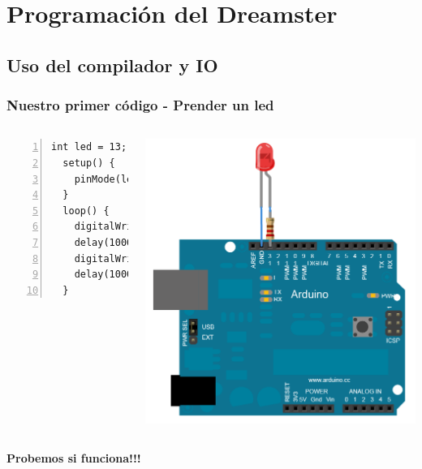 \documentclass[compress]{beamer}
\begin{document}
\section{Programación del Dreamster}
\subsection{Uso del compilador y IO}

\begin{frame}[fragile]
\frametitle{Nuestro primer código - Prender un led}

\begin{columns}
  \begin{Verbatim}[formatcom=\color{red},fontseries=b, numbers=left,numbersep=3pt]
  int led = 13;
  setup() {
    pinMode(led, OUTPUT);
  }
  loop() {
    digitalWrite(led, HIGH);
    delay(1000);
    digitalWrite(led, LOW);
    delay(1000);
  }
  \end{Verbatim} 

   \includegraphics[width=\columnwidth]{./img/arduino_led.png}

\end{columns}


 \begin{center}
 \vspace{0.5cm}
 \textbf{Probemos si funciona!!!}
 \end{center}

\end{frame}
\end{document}
